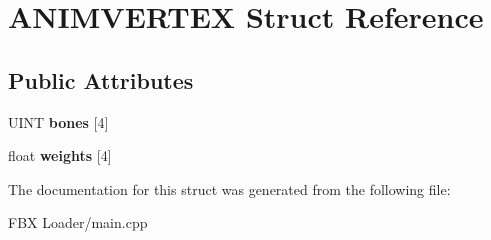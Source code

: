 \hypertarget{struct_a_n_i_m_v_e_r_t_e_x}{}\section{A\+N\+I\+M\+V\+E\+R\+T\+EX Struct Reference}
\label{struct_a_n_i_m_v_e_r_t_e_x}
\subsection*{Public Attributes}
\begin{DoxyCompactItemize}
\item 
U\+I\+NT {\bfseries bones} \mbox{[}4\mbox{]}\hypertarget{struct_a_n_i_m_v_e_r_t_e_x_a1177abc42b1167ff0f87f4cd45a1f8d6}{}\label{struct_a_n_i_m_v_e_r_t_e_x_a1177abc42b1167ff0f87f4cd45a1f8d6}

\item 
float {\bfseries weights} \mbox{[}4\mbox{]}\hypertarget{struct_a_n_i_m_v_e_r_t_e_x_a834880e5ba46264ac5c631686bc16ff8}{}\label{struct_a_n_i_m_v_e_r_t_e_x_a834880e5ba46264ac5c631686bc16ff8}

\end{DoxyCompactItemize}


The documentation for this struct was generated from the following file\+:\begin{DoxyCompactItemize}
\item 
F\+B\+X Loader/main.\+cpp\end{DoxyCompactItemize}
